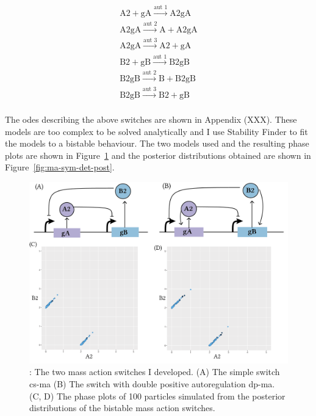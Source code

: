 $$
\begin{array}{cccc} 
    \textrm{A2} + \textrm{gA} \stackrel{\textrm{aut 1}}{\longrightarrow} \textrm{A2gA} \\
    \textrm{A2gA} \stackrel{\textrm{aut 2}}{\longrightarrow} \textrm{A} + \textrm{A2gA}\\
    \textrm{A2gA} \stackrel{\textrm{aut 3}}{\longrightarrow} \textrm{A2}+ \textrm{gA}  \\
    \textrm{B2} + \textrm{gB} \stackrel{\textrm{aut 1}}{\longrightarrow} \textrm{B2gB} \\
    \textrm{B2gB} \stackrel{\textrm{aut 2}}{\longrightarrow} \textrm{B} + \textrm{B2gB}\\
    \textrm{B2gB} \stackrel{\textrm{aut 3}}{\longrightarrow} \textrm{B2}+ \textrm{gB}  \\
\end{array}
$$

The \acrshort{ode}s describing the above switches are shown in Appendix (XXX). These models are too complex to be solved analytically and I use Stability Finder to fit the models to a bistable behaviour. The two models used and the resulting phase plots are shown in Figure~\ref{fig:ma-cs-dp-phase} and the posterior distributions  obtained are shown in Figure~\ref{fig:ma-sym-det-post}. 

\begin{figure}[htbp]
\begin{center}
\includegraphics[scale=0.7]{../../chapters/chapterStabilityFinder/images/MA-cs-dp-phase.png}
\caption[The mass action togge switches and phase plots]{ \label{fig:ma-cs-dp-phase}: The two mass action switches I developed. (A) The simple switch \acrshort{cs-ma} (B) The switch with double positive autoregulation \acrshort{dp-ma}. (C, D) The phase plots of 100 particles simulated from the posterior distributions of the bistable mass action switches.}
\end{center}
\end{figure}


